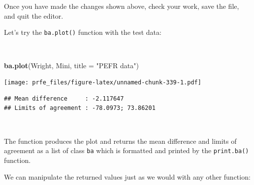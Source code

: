 \documentclass[12pt,a4paper]{book}
\newenvironment{Shaded}{\begin{snugshade}}{\end{snugshade}}
\newcommand{\KeywordTok}[1]{\textcolor[rgb]{0.13,0.29,0.53}{\textbf{#1}}}
\newcommand{\DataTypeTok}[1]{\textcolor[rgb]{0.13,0.29,0.53}{#1}}
\newcommand{\DecValTok}[1]{\textcolor[rgb]{0.00,0.00,0.81}{#1}}
\newcommand{\CharTok}[1]{\textcolor[rgb]{0.31,0.60,0.02}{#1}}
\newcommand{\StringTok}[1]{\textcolor[rgb]{0.31,0.60,0.02}{#1}}
\newcommand{\ControlFlowTok}[1]{\textcolor[rgb]{0.13,0.29,0.53}{\textbf{#1}}}
\newcommand{\OperatorTok}[1]{\textcolor[rgb]{0.81,0.36,0.00}{\textbf{#1}}}
\newcommand{\NormalTok}[1]{#1}
\theoremstyle{definition}
\theoremstyle{definition}
\theoremstyle{definition}
\theoremstyle{remark}
\begin{document}
~

\begin{Shaded}
\end{Shaded}

~

Once you have made the changes shown above, check your work, save the
file, and quit the editor.

Let's try the \texttt{ba.plot()} function with the test data:

~

\begin{Shaded}
\begin{Highlighting}[]
\KeywordTok{ba.plot}\NormalTok{(Wright, Mini, }\DataTypeTok{title =} \StringTok{"PEFR data"}\NormalTok{)}
\end{Highlighting}
\end{Shaded}

\texttt{[image: prfe\_files/figure-latex/unnamed-chunk-339-1.pdf]}

\begin{verbatim}
## Mean difference     : -2.117647
## Limits of agreement : -78.0973; 73.86201
\end{verbatim}

~

The function produces the plot and returns the mean difference and
limits of agreement as a list of class \texttt{ba} which is formatted
and printed by the \texttt{print.ba()} function.

We can manipulate the returned values just as we would with any other
function:

~

\begin{Shaded}
\end{Shaded}
\end{document}

